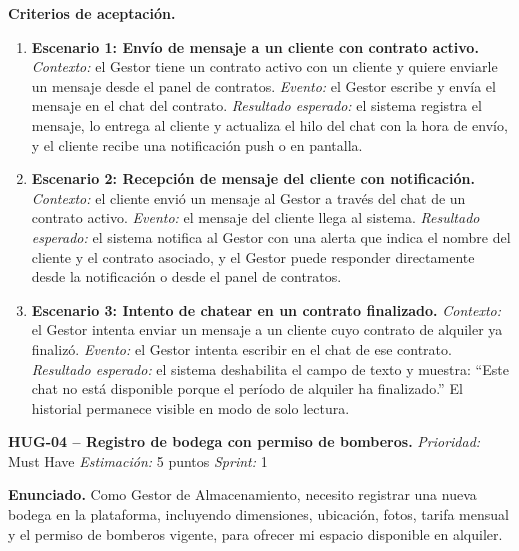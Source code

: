 \textbf{Criterios de aceptación.}
\begin{enumerate}
\item \textbf{Escenario 1: Envío de mensaje a un cliente con contrato activo.} \textit{Contexto:} el Gestor tiene un contrato activo con un cliente y quiere enviarle un mensaje desde el panel de contratos. \textit{Evento:} el Gestor escribe y envía el mensaje en el chat del contrato. \textit{Resultado esperado:} el sistema registra el mensaje, lo entrega al cliente y actualiza el hilo del chat con la hora de envío, y el cliente recibe una notificación push o en pantalla.
\item \textbf{Escenario 2: Recepción de mensaje del cliente con notificación.} \textit{Contexto:} el cliente envió un mensaje al Gestor a través del chat de un contrato activo. \textit{Evento:} el mensaje del cliente llega al sistema. \textit{Resultado esperado:} el sistema notifica al Gestor con una alerta que indica el nombre del cliente y el contrato asociado, y el Gestor puede responder directamente desde la notificación o desde el panel de contratos.
\item \textbf{Escenario 3: Intento de chatear en un contrato finalizado.} \textit{Contexto:} el Gestor intenta enviar un mensaje a un cliente cuyo contrato de alquiler ya finalizó. \textit{Evento:} el Gestor intenta escribir en el chat de ese contrato. \textit{Resultado esperado:} el sistema deshabilita el campo de texto y muestra: ``Este chat no está disponible porque el período de alquiler ha finalizado.'' El historial permanece visible en modo de solo lectura.
\end{enumerate}

\textbf{HUG-04 -- Registro de bodega con permiso de bomberos.} \label{req:HUG-04}
\textit{Prioridad:} Must Have \quad \textit{Estimación:} 5 puntos \quad \textit{Sprint:} 1

\textbf{Enunciado.} Como Gestor de Almacenamiento, necesito registrar una nueva bodega en la plataforma, incluyendo dimensiones, ubicación, fotos, tarifa mensual y el permiso de bomberos vigente, para ofrecer mi espacio disponible en alquiler.

